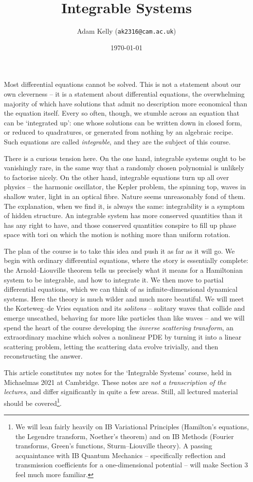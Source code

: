 \documentclass[a4paper]{scrartcl}
\title{Integrable Systems}
\author{Adam Kelly (\texttt{ak2316@cam.ac.uk})}
\date{\today}
\begin{document}
\maketitle

Most differential equations cannot be solved. This is not a statement about our own cleverness -- it is a statement about differential equations, the overwhelming majority of which have solutions that admit no description more economical than the equation itself. Every so often, though, we stumble across an equation that can be `integrated up': one whose solutions can be written down in closed form, or reduced to quadratures, or generated from nothing by an algebraic recipe. Such equations are called \emph{integrable}, and they are the subject of this course.

There is a curious tension here. On the one hand, integrable systems ought to be vanishingly rare, in the same way that a randomly chosen polynomial is unlikely to factorise nicely. On the other hand, integrable equations turn up all over physics -- the harmonic oscillator, the Kepler problem, the spinning top, waves in shallow water, light in an optical fibre. Nature seems unreasonably fond of them. The explanation, when we find it, is always the same: integrability is a symptom of hidden structure. An integrable system has more conserved quantities than it has any right to have, and those conserved quantities conspire to fill up phase space with tori on which the motion is nothing more than uniform rotation.

The plan of the course is to take this idea and push it as far as it will go. We begin with ordinary differential equations, where the story is essentially complete: the Arnold--Liouville theorem tells us precisely what it means for a Hamiltonian system to be integrable, and how to integrate it. We then move to partial differential equations, which we can think of as infinite-dimensional dynamical systems. Here the theory is much wilder and much more beautiful. We will meet the Korteweg--de Vries equation and its \emph{solitons} -- solitary waves that collide and emerge unscathed, behaving far more like particles than like waves -- and we will spend the heart of the course developing the \emph{inverse scattering transform}, an extraordinary machine which solves a nonlinear PDE by turning it into a linear scattering problem, letting the scattering data evolve trivially, and then reconstructing the answer.

This article constitutes my notes for the `Integrable Systems' course, held in Michaelmas 2021 at Cambridge. These notes are \emph{not a transcription of the lectures}, and differ significantly in quite a few areas. Still, all lectured material should be covered\footnote{We will lean fairly heavily on IB Variational Principles (Hamilton's equations, the Legendre transform, Noether's theorem) and on IB Methods (Fourier transforms, Green's functions, Sturm--Liouville theory). A passing acquaintance with IB Quantum Mechanics -- specifically reflection and transmission coefficients for a one-dimensional potential -- will make Section 3 feel much more familiar.}.
\end{document}
